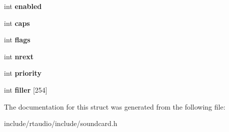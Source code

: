 \begin{DoxyCompactItemize}
\item 
int {\bfseries enabled}\hypertarget{structoss__mixerinfo_a78af99fac80b95106c18f6c98364d835}{}\label{structoss__mixerinfo_a78af99fac80b95106c18f6c98364d835}

\item 
int {\bfseries caps}\hypertarget{structoss__mixerinfo_a54a812a2484b6dbb7f580d0b2e9e0d43}{}\label{structoss__mixerinfo_a54a812a2484b6dbb7f580d0b2e9e0d43}

\item 
int {\bfseries flags}\hypertarget{structoss__mixerinfo_a2a902a49a3d608ce8319065dea7fe773}{}\label{structoss__mixerinfo_a2a902a49a3d608ce8319065dea7fe773}

\item 
int {\bfseries nrext}\hypertarget{structoss__mixerinfo_aff510a2885b71b9337857c74fc89f6c1}{}\label{structoss__mixerinfo_aff510a2885b71b9337857c74fc89f6c1}

\item 
int {\bfseries priority}\hypertarget{structoss__mixerinfo_a6ecdd6ef6616be4e6baeb21873464132}{}\label{structoss__mixerinfo_a6ecdd6ef6616be4e6baeb21873464132}

\item 
int {\bfseries filler} \mbox{[}254\mbox{]}\hypertarget{structoss__mixerinfo_ae8cbe120f0e1425b0215de06da9b89ac}{}\label{structoss__mixerinfo_ae8cbe120f0e1425b0215de06da9b89ac}

\end{DoxyCompactItemize}


The documentation for this struct was generated from the following file\+:\begin{DoxyCompactItemize}
\item 
include/rtaudio/include/soundcard.\+h\end{DoxyCompactItemize}

